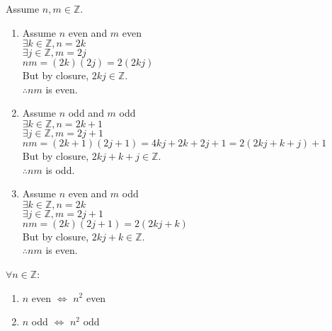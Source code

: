 \documentclass[letterpaper,12pt,fleqn]{article}
\begin{document}
\begin{theproof}
Assume $n,m\in\mathbb{Z}$.
\begin{enumerate}
\item{Assume $n$ even and $m$ even \\}
$\exists k\in\mathbb{Z},n=2k$ \\
$\exists j\in\mathbb{Z},m=2j$ \\
$nm=(2k)(2j)=2(2kj)$ \\
But by closure, $2kj\in\mathbb{Z}$. \\
$\therefore nm$ is even.

\item {Assume $n$ odd and $m$ odd \\}
$\exists k\in\mathbb{Z},n=2k+1$ \\
$\exists j\in\mathbb{Z},m=2j+1$ \\
$nm=(2k+1)(2j+1)=4kj+2k+2j+1=2(2kj+k+j)+1$ \\
But by closure, $2kj+k+j\in\mathbb{Z}$. \\
$\therefore nm$ is odd.

\item {Assume $n$ even and $m$ odd \\}
$\exists k\in\mathbb{Z},n=2k$ \\
$\exists j\in\mathbb{Z},m=2j+1$ \\
$nm=(2k)(2j+1)=2(2kj+k)$ \\
But by closure, $2kj+k\in\mathbb{Z}$. \\
$\therefore nm$ is even.
\end{enumerate}
\end{theproof}

\begin{theorem}
$\forall n\in\mathbb{Z}$:
\begin{enumerate}
\item{$n$ even $\iff$ $n^2$ even}
\item{$n$ odd $\iff$ $n^2$ odd}
\end{enumerate}
\end{theorem}
\end{document}
